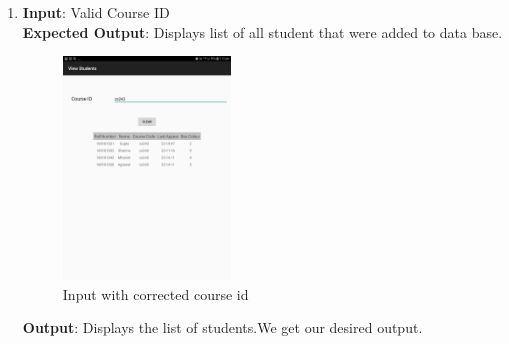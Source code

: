 \documentclass{scrreprt}
\begin{document}
\begin{itemize}
\begin{enumerate}
\item \textbf{Input}:  Valid Course ID\\
\textbf{Expected Output}: Displays list of all student that were added to data base.
\begin{figure}[H]
\centering
\includegraphics[width=0.42\textwidth, keepaspectratio]{viewdone.jpg}
\caption{Input with corrected course id}
\end{figure}
\textbf{Output}: Displays the list of students.We get our desired output.

\end{enumerate}
\end{itemize}
\end{document}
